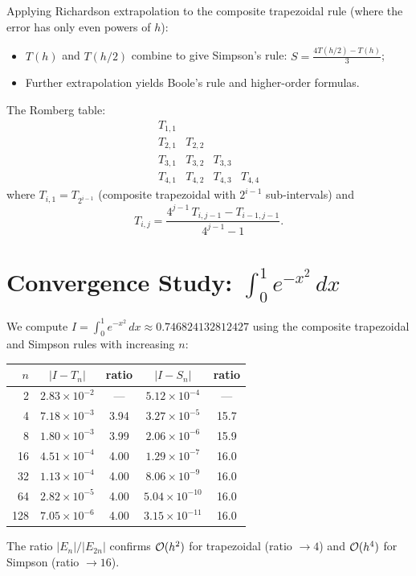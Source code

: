 \begin{example}
\label{ex:romberg}
Applying Richardson extrapolation to the composite trapezoidal rule (where the error has only even powers of $h$):
\begin{itemize}
    \item $T(h)$ and $T(h/2)$ combine to give Simpson's rule: $S = \frac{4T(h/2) - T(h)}{3}$;
    \item Further extrapolation yields Boole's rule and higher-order formulas.
\end{itemize}
The Romberg table:
\[
\begin{array}{cccc}
    T_{1,1} & & & \\
    T_{2,1} & T_{2,2} & & \\
    T_{3,1} & T_{3,2} & T_{3,3} & \\
    T_{4,1} & T_{4,2} & T_{4,3} & T_{4,4}
\end{array}
\]
where $T_{i,1} = T_{2^{i-1}}$ (composite trapezoidal with $2^{i-1}$ sub-intervals) and
\[
    T_{i,j} = \frac{4^{j-1}\,T_{i,j-1} - T_{i-1,j-1}}{4^{j-1} - 1}.
\]
\end{example}

\section{Convergence Study: $\int_0^1 e^{-x^2}\,dx$}

\begin{example}
\label{ex:convergence-integration}
We compute $I = \int_0^1 e^{-x^2}\,dx \approx 0.746824132812427$ using the composite trapezoidal and Simpson rules with increasing $n$:

\begin{center}
\begin{tabular}{r|cc|cc}
    \toprule
    $n$ & $|I - T_n|$ & ratio & $|I - S_n|$ & ratio \\
    \midrule
    2   & $2.83 \times 10^{-2}$ & ---  & $5.12 \times 10^{-4}$ & --- \\
    4   & $7.18 \times 10^{-3}$ & 3.94 & $3.27 \times 10^{-5}$ & 15.7 \\
    8   & $1.80 \times 10^{-3}$ & 3.99 & $2.06 \times 10^{-6}$ & 15.9 \\
    16  & $4.51 \times 10^{-4}$ & 4.00 & $1.29 \times 10^{-7}$ & 16.0 \\
    32  & $1.13 \times 10^{-4}$ & 4.00 & $8.06 \times 10^{-9}$ & 16.0 \\
    64  & $2.82 \times 10^{-5}$ & 4.00 & $5.04 \times 10^{-10}$& 16.0 \\
    128 & $7.05 \times 10^{-6}$ & 4.00 & $3.15\times 10^{-11}$ & 16.0 \\
    \bottomrule
\end{tabular}
\end{center}
The ratio $|E_n|/|E_{2n}|$ confirms $\mathcal{O}(h^2)$ for trapezoidal (ratio $\to 4$) and $\mathcal{O}(h^4)$ for Simpson (ratio $\to 16$).
\end{example}

